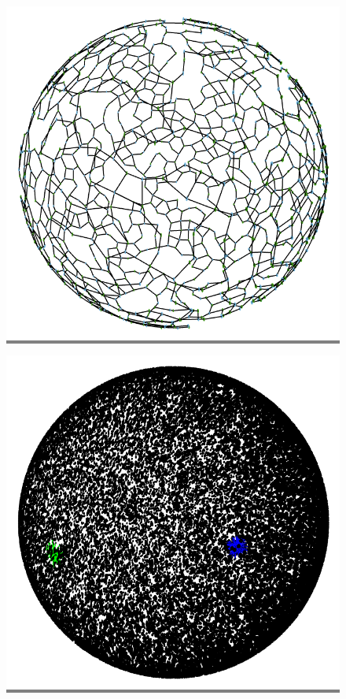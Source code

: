 \documentclass{article}
\begin{document}
\begin{figure}
\begin{minipage}{0.3\textwidth}
    \end{minipage}
    \hspace{\fill}
    \begin{minipage}{0.3\textwidth}
    \colorbox{gray}{\includegraphics[width=\linewidth]{./images/sphere_0_bb_1.png}}
    \end{minipage}
    \vskip 0.1in
    \begin{minipage}{0.3\textwidth}
    \colorbox{gray}{\includegraphics[width=\linewidth]{./images/sphere_1.png}}

\end{minipage}
\end{figure}
\end{document}
